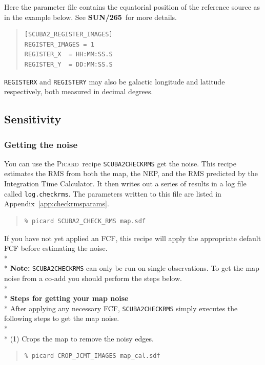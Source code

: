 \documentclass[twoside,11pt]{article}
\newcommand{\htmlref}[2]{#1}
\newcommand{\latexhtml}[2]{#1}
\newcommand{\xref}[3]{#1}
\newcommand{\xlabel}[1]{}
\renewcommand{\_}{\texttt{\symbol{95}}}
\newenvironment{myquote}{
   \color{MidnightBlue}\begin{quote}\begin{small}}{
   \end{small}\end{quote}
}
\newcommand{\picard}{\xref{\textsc{Picard}}{sun265}{}}
\newcommand{\drrecipe}[1]{\texttt{#1}}
\newcommand{\param}[1]{\texttt{#1}}
\newcommand{\file}[1]{\texttt{#1}}
\newcommand{\picardsun}{\xref{\textbf{SUN/265}}{sun265}{}}
\newcommand{\cref}[3]{\latexhtml{#1~\ref{#2}}{\htmlref{#3}{#2}}}
\renewenvironment{myquote}{
      \begin{quote}\begin{small}}{
      \end{small}\end{quote}
   }
\begin{document}
Here the parameter file contains the equatorial position of the reference source
as in the example below. See \picardsun\ for more details.
\begin{center}
\begin{quote}
\begin{verbatim}
[SCUBA2_REGISTER_IMAGES]
REGISTER_IMAGES = 1
REGISTER_X  = HH:MM:SS.S
REGISTER_Y  = DD:MM:SS.S
\end{verbatim}
\end{quote}
\end{center}

\param{REGISTER\_X} and \param{REGISTER\_Y} may also be galactic
longitude and latitude respectively, both measured in decimal
degrees.

\subsection{\xlabel{noise}Sensitivity}

\subsubsection{Getting the noise}
\label{sec:checkrms}

You can use the \picard\ recipe \drrecipe{SCUBA2\_CHECK\_RMS} get the
noise. This recipe estimates the RMS from both the map, the NEP, and
the RMS predicted by the Integration Time Calculator. It then writes out
a series of results in a log file called \file{log.checkrms}. The
parameters written to this file are listed in
\cref{Appendix}{app:checkrmsparams}{SCUBA2_CHECK_RMS}.

\begin{myquote}
\begin{verbatim}
% picard SCUBA2_CHECK_RMS map.sdf
\end{verbatim}
\end{myquote}
If you have not yet applied an FCF, this recipe will apply the
appropriate default FCF before estimating the noise.
\\*\\*
\textbf{Note:} \drrecipe{SCUBA2\_CHECK\_RMS} can only be run on single
observations. To get the map noise from a co-add you should perform the steps below.
\\*\\*
\textbf{Steps for getting your map noise}\\*
After applying any necessary FCF, \drrecipe{SCUBA2\_CHECK\_RMS} simply executes
the following steps to get the map noise.
\\*\\*
(1) Crops the map to remove the noisy edges.
\begin{myquote}
\begin{verbatim}
% picard CROP_JCMT_IMAGES map_cal.sdf
\end{verbatim}
\end{myquote}
\end{document}
